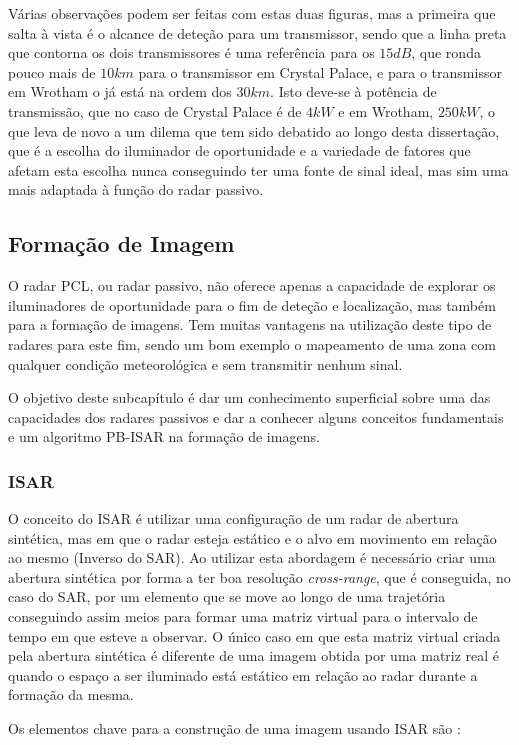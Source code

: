 Várias observações podem ser feitas com estas duas figuras, mas a primeira que salta à vista é o alcance de deteção para um transmissor, sendo que a linha preta que contorna os dois transmissores é uma referência para os $15dB$, que ronda pouco mais de $10km$ para o transmissor em Crystal Palace, e para o transmissor em Wrotham o já está na ordem dos $30km$. Isto deve-se à potência de transmissão, que no caso de Crystal Palace é de $4kW$ e em Wrotham, $250kW$, o que leva de novo a um dilema que tem sido debatido ao longo desta dissertação, que é a escolha do iluminador de oportunidade e a variedade de fatores que afetam esta escolha nunca conseguindo ter uma fonte de sinal ideal, mas sim uma mais adaptada à função do radar passivo.


\subsection{Formação de Imagem}
O radar \gls{PCL}, ou radar passivo, não oferece apenas a capacidade de explorar os iluminadores de oportunidade para o fim de deteção e localização, mas também para a formação de imagens. Tem muitas vantagens na utilização deste tipo de radares para este fim, sendo um bom exemplo o mapeamento de uma zona com qualquer condição meteorológica e sem transmitir nenhum sinal.\par 
O objetivo deste subcapítulo é dar um conhecimento superficial sobre uma das capacidades dos radares passivos e dar a conhecer alguns conceitos fundamentais e um algoritmo \gls{PB-ISAR} na formação de imagens.\par 

\subsubsection*{\gls{ISAR}}
O conceito do \gls{ISAR} é utilizar uma configuração de um radar de abertura sintética, mas em que o radar esteja estático e o alvo em movimento em relação ao mesmo (Inverso do \gls{SAR}). Ao utilizar esta abordagem é necessário criar uma abertura sintética por forma a ter boa resolução \textit{cross-range}, que é conseguida, no caso do \gls{SAR}, por um elemento que se move ao longo de uma trajetória conseguindo assim meios para formar uma matriz virtual para o intervalo de tempo em que esteve a observar. O único caso em que esta matriz virtual criada pela abertura sintética é diferente de uma imagem obtida por uma matriz real é quando o espaço a ser iluminado está estático em relação ao radar durante a formação da mesma.\par 
Os elementos chave para a construção de uma imagem usando \gls{ISAR} são \parencite{Martorella2019}:

